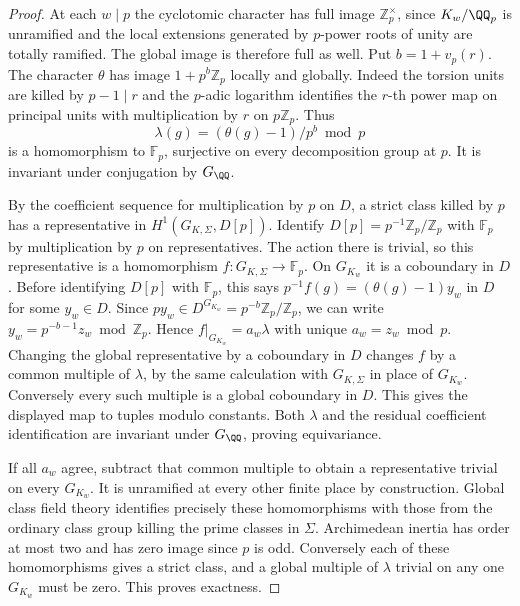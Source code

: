 \documentclass[a4paper,11pt]{article}
\theoremstyle{definition}
\theoremstyle{remark}
\newcommand{\ZZ}{\mathbb Z}\newcommand{\ord}{\operatorname{ord}}
\numberwithin{equation}{section}
\begin{document}
\begin{proof}
At each \(w\mid p\) the cyclotomic character has full image
\(\ZZ_p^\times\), since \(K_w/\QQ_p\) is unramified and the
local extensions generated by \(p\)-power roots of unity are
totally ramified. The global image is therefore full as well.
Put \(b=1+v_p(r)\). The character \(\theta\) has image
\(1+p^b\ZZ_p\) locally and globally. Indeed the torsion units
are killed by \(p-1\mid r\) and the \(p\)-adic logarithm
identifies the \(r\)-th power map on principal units with
multiplication by \(r\) on \(p\ZZ_p\).
Thus
\[
             \lambda(g)=(\theta(g)-1)/p^b\bmod p
\]
is a homomorphism to \(\mathbb F_p\), surjective on every
decomposition group at \(p\). It is invariant under conjugation
by \(G_\QQ\).

By the coefficient sequence for multiplication by \(p\) on
\(D\), a strict class killed by \(p\) has a representative in
\(H^1(G_{K,\Sigma},D[p])\). Identify \(D[p]=p^{-1}\ZZ_p/\ZZ_p\)
with \(\mathbb F_p\) by multiplication by \(p\) on representatives.
The action there is trivial, so this representative is a
homomorphism \(f:G_{K,\Sigma}\to\mathbb F_p\).
On \(G_{K_w}\) it is a coboundary in \(D\). Before identifying
\(D[p]\) with \(\mathbb F_p\), this says
\(p^{-1}f(g)=(\theta(g)-1)y_w\) in \(D\) for some \(y_w\in D\).
Since \(p y_w\in D^{G_{K_w}}=p^{-b}\ZZ_p/\ZZ_p\), we can
write \(y_w=p^{-b-1}z_w\bmod\ZZ_p\). Hence
\(f|_{G_{K_w}}=a_w\lambda\) with unique \(a_w=z_w\bmod p\).
Changing the global representative by a coboundary in \(D\)
changes \(f\) by a common multiple of \(\lambda\), by the same
calculation with \(G_{K,\Sigma}\) in place of \(G_{K_w}\).
Conversely every such multiple is a global coboundary in \(D\).
This gives the displayed map to tuples modulo constants.
Both \(\lambda\) and the residual coefficient identification
are invariant under \(G_\QQ\), proving equivariance.

If all \(a_w\) agree, subtract that common multiple to obtain a
representative trivial on every \(G_{K_w}\). It is unramified
at every other finite place by construction. Global class
field theory identifies precisely these homomorphisms with
those from the ordinary class group killing the prime classes
in \(\Sigma\). Archimedean inertia has order at most two and
has zero image since \(p\) is odd. Conversely each of these
homomorphisms gives a strict class, and a global multiple of
\(\lambda\) trivial on any one \(G_{K_w}\) must be zero. This
proves exactness.
\end{proof}
\end{document}
